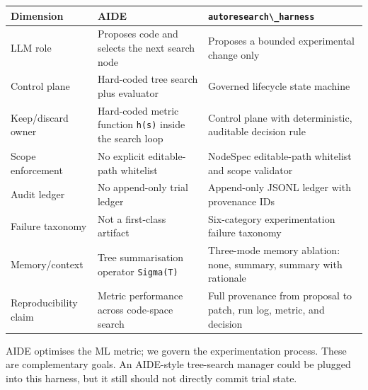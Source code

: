 \begin{table}[t]
\small
\begin{tabular}{@{}
  >{\raggedright\arraybackslash}p{}
  >{\raggedright\arraybackslash}p{}
  >{\raggedright\arraybackslash}p{}@{}}
\toprule
\begin{minipage}[b]{\linewidth}\raggedright
Dimension
\end{minipage} & \begin{minipage}[b]{\linewidth}\raggedright
AIDE
\end{minipage} & \begin{minipage}[b]{\linewidth}\raggedright
\passthrough{\lstinline!autoresearch\_harness!}
\end{minipage} \\
\midrule
\bottomrule
LLM role & Proposes code and selects the next search node & Proposes a bounded experimental change only \\
Control plane & Hard-coded tree search plus evaluator & Governed lifecycle state machine \\
Keep/discard owner & Hard-coded metric function \passthrough{\lstinline!h(s)!} inside the search loop & Control plane with deterministic, auditable decision rule \\
Scope enforcement & No explicit editable-path whitelist & NodeSpec editable-path whitelist and scope validator \\
Audit ledger & No append-only trial ledger & Append-only JSONL ledger with provenance IDs \\
Failure taxonomy & Not a first-class artifact & Six-category experimentation failure taxonomy \\
Memory/context & Tree summarisation operator \passthrough{\lstinline!Sigma(T)!} & Three-mode memory ablation: none, summary, summary with rationale \\
Reproducibility claim & Metric performance across code-space search & Full provenance from proposal to patch, run log, metric, and decision \\
\end{tabular}
\end{table}

AIDE optimises the ML metric; we govern the experimentation process. These are complementary goals. An AIDE-style tree-search manager could be plugged into this harness, but it still should not directly commit trial state.

